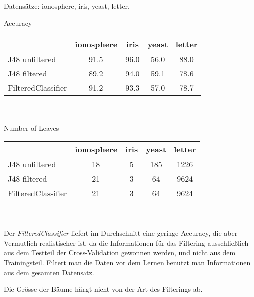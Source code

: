 Datens\"atze: ionosphere, iris, yeast, letter.

Accuracy \\
\begin{tabular}{l|c|c|c|c}
	               & ionosphere & iris  & yeast & letter \\ \hline
J48 unfiltered     &  91.5      &  96.0 &  56.0 &  88.0  \\ \hline
J48 filtered       &  89.2      &  94.0 &  59.1 &  78.6  \\ \hline
FilteredClassifier &  91.2      &  93.3 &  57.0 &  78.7  \\ \hline
\end{tabular}\\ \\

Number of Leaves \\
\begin{tabular}{l|c|c|c|c}
	               & ionosphere & iris  & yeast & letter \\ \hline
J48 unfiltered     &  18        &  5    &  185  &  1226  \\ \hline
J48 filtered       &  21        &  3    &  64   &  9624  \\ \hline
FilteredClassifier &  21        &  3    &  64   &  9624  \\ \hline
\end{tabular}\\ \\


Der \emph{FilteredClassifier} liefert im Durchschnitt eine geringe Accuracy, die aber Vermutlich realistischer ist, da die Informationen f\"ur das Filtering ausschlie\ss lich aus dem Testteil der Cross-Validation gewonnen werden, und nicht aus dem Trainingsteil. Filtert man die Daten vor dem Lernen benutzt man Informationen aus dem gesamten Datensatz. 

Die Gr\" osse der B\"aume h\"angt nicht von der Art des Filterings ab.

